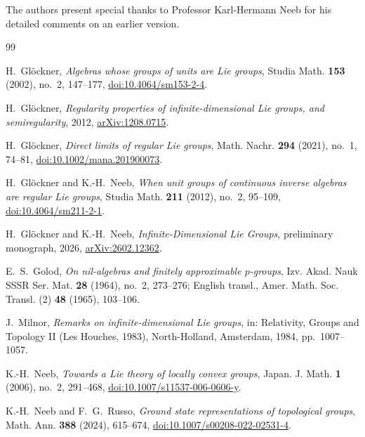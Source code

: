 \documentclass[11pt]{article}
\theoremstyle{remark}
\begin{document}
The authors present special thanks to Professor Karl-Hermann Neeb 
for his detailed comments on an earlier version.

\begin{thebibliography}{99}

H.~Gl\"ockner,
\emph{Algebras whose groups of units are Lie groups},
Studia Math. \textbf{153} (2002), no.~2, 147--177,
\href{https://doi.org/10.4064/sm153-2-4}{doi:10.4064/sm153-2-4}.

H.~Gl\"ockner,
\emph{Regularity properties of infinite-dimensional Lie groups, and
semiregularity},
2012, \href{https://doi.org/10.48550/arXiv.1208.0715}{arXiv:1208.0715}.

H.~Gl\"ockner,
\emph{Direct limits of regular Lie groups},
Math. Nachr. \textbf{294} (2021), no.~1, 74--81,
\href{https://doi.org/10.1002/mana.201900073}{doi:10.1002/mana.201900073}.

H.~Gl\"ockner and K.-H.~Neeb,
\emph{When unit groups of continuous inverse algebras are regular Lie groups},
Studia Math. \textbf{211} (2012), no.~2, 95--109,
\href{https://doi.org/10.4064/sm211-2-1}{doi:10.4064/sm211-2-1}.

H.~Gl\"ockner and K.-H.~Neeb,
\emph{Infinite-Dimensional Lie Groups},
preliminary monograph, 2026,
\href{https://doi.org/10.48550/arXiv.2602.12362}{arXiv:2602.12362}.

E.~S.~Golod,
\emph{On nil-algebras and finitely approximable $p$-groups},
Izv. Akad. Nauk SSSR Ser. Mat. \textbf{28} (1964), no.~2, 273--276;
English transl., Amer. Math. Soc. Transl. (2) \textbf{48} (1965), 103--106.

J.~Milnor,
\emph{Remarks on infinite-dimensional Lie groups},
in: Relativity, Groups and Topology II (Les Houches, 1983),
North-Holland, Amsterdam, 1984, pp.~1007--1057.

K.-H.~Neeb,
\emph{Towards a Lie theory of locally convex groups},
Japan. J. Math. \textbf{1} (2006), no.~2, 291--468,
\href{https://doi.org/10.1007/s11537-006-0606-y}{doi:10.1007/s11537-006-0606-y}.

K.-H.~Neeb and F.~G.~Russo,
\emph{Ground state representations of topological groups},
Math. Ann. \textbf{388} (2024), 615--674,
\href{https://doi.org/10.1007/s00208-022-02531-4}{doi:10.1007/s00208-022-02531-4}.


\end{thebibliography}
\end{document}
